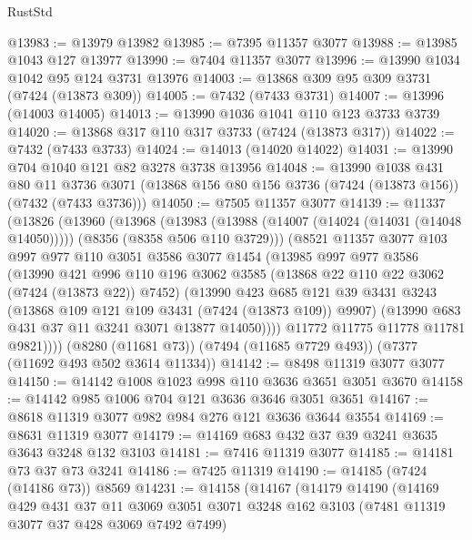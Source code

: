 \begin{lexlean}{RustStd}
\begin{coremodule}
@13983 := @13979 @13982
@13985 := @7395 @11357 @3077
@13988 := @13985 @1043 @127 @13977
@13990 := @7404 @11357 @3077
@13996 := @13990 @1034 @1042 @95 @124 @3731 @13976
@14003 := @13868 @309 @95 @309 @3731 (@7424 (@13873 @309))
@14005 := @7432 (@7433 @3731)
@14007 := @13996 (@14003 @14005)
@14013 := @13990 @1036 @1041 @110 @123 @3733 @3739
@14020 := @13868 @317 @110 @317 @3733 (@7424 (@13873 @317))
@14022 := @7432 (@7433 @3733)
@14024 := @14013 (@14020 @14022)
@14031 := @13990 @704 @1040 @121 @82 @3278 @3738 @13956
@14048 := @13990
    @1038
    @431
    @80
    @11
    @3736
    @3071
    (@13868 @156 @80 @156 @3736 (@7424 (@13873 @156)) (@7432 (@7433 @3736)))
@14050 := @7505 @11357 @3077
@14139 := @11337
    (@13826
      (@13960
        (@13968
          (@13983
            (@13988 (@14007 (@14024 (@14031 (@14048 @14050)))))
            (@8356 (@8358 @506 @110 @3729)))
          (@8521
            @11357
            @3077
            @103
            @997
            @977
            @110
            @3051
            @3586
            @3077
            @1454
            (@13985
              @997
              @977
              @3586
              (@13990
                @421
                @996
                @110
                @196
                @3062
                @3585
                (@13868 @22 @110 @22 @3062 (@7424 (@13873 @22)) @7452)
                (@13990
                  @423
                  @685
                  @121
                  @39
                  @3431
                  @3243
                  (@13868 @109 @121 @109 @3431 (@7424 (@13873 @109)) @9907)
                  (@13990 @683 @431 @37 @11 @3241 @3071 @13877 @14050))))
            @11772
            @11775
            @11778
            @11781
            @9821))))
    (@8280 (@11681 @73))
    (@7494 (@11685 @7729 @493))
    (@7377 (@11692 @493 @502 @3614 @11334))
@14142 := @8498 @11319 @3077 @3077
@14150 := @14142 @1008 @1023 @998 @110 @3636 @3651 @3051 @3670
@14158 := @14142 @985 @1006 @704 @121 @3636 @3646 @3051 @3651
@14167 := @8618 @11319 @3077 @982 @984 @276 @121 @3636 @3644 @3554
@14169 := @8631 @11319 @3077
@14179 := @14169 @683 @432 @37 @39 @3241 @3635 @3643 @3248 @132 @3103
@14181 := @7416 @11319 @3077
@14185 := @14181 @73 @37 @73 @3241
@14186 := @7425 @11319
@14190 := @14185 (@7424 (@14186 @73)) @8569
@14231 := @14158
    (@14167
      (@14179
        @14190
        (@14169
          @429
          @431
          @37
          @11
          @3069
          @3051
          @3071
          @3248
          @162
          @3103
          (@7481 @11319 @3077 @37 @428 @3069 @7492 @7499)

\end{coremodule}
\end{lexlean}

